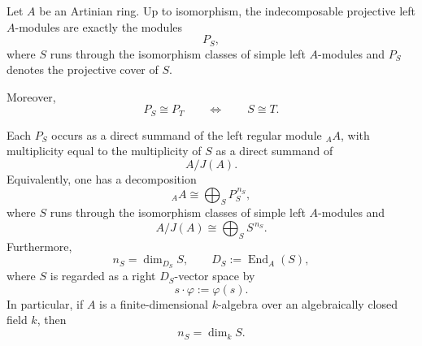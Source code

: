 \begin{theorem}\label{thm:indecomposable-projectives-artinian}
    Let $A$ be an Artinian ring. Up to isomorphism, the indecomposable projective
    left $A$-modules are exactly the modules
    \[
        P_S,
    \]
    where $S$ runs through the isomorphism classes of simple left $A$-modules and
    $P_S$ denotes the projective cover of $S$.

    Moreover,
    \[
        P_S\cong P_T
        \qquad\Longleftrightarrow\qquad
        S\cong T.
    \]

    Each $P_S$ occurs as a direct summand of the left regular module ${}_A A$, with
    multiplicity equal to the multiplicity of $S$ as a direct summand of
    \[
        A/J(A).
    \]
    Equivalently, one has a decomposition
    \[
        {}_A A\cong \bigoplus_{S} P_S^{\,n_S},
    \]
    where $S$ runs through the isomorphism classes of simple left $A$-modules and
    \[
        A/J(A)\cong \bigoplus_S S^{\,n_S}.
    \]
    Furthermore,
    \[
        n_S=\dim_{D_S} S,
        \qquad
        D_S:=\operatorname{End}_A(S),
    \]
    where $S$ is regarded as a right $D_S$-vector space by
    \[
        s\cdot \varphi:=\varphi(s).
    \]
    In particular, if $A$ is a finite-dimensional $k$-algebra over an algebraically closed
    field $k$, then
    \[
        n_S=\dim_k S.
    \]
\end{theorem}


